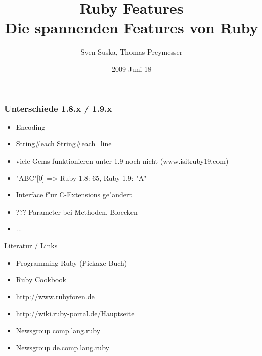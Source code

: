 \documentclass{beamer}
\title[Ruby]{Ruby Features\\Die spannenden Features von Ruby}
\author{Sven Suska, Thomas Preymesser}
\date{2009-Juni-18}
\begin{document}
\lstset{language=Ruby}
\lstset{basicstyle=\small,numbers=left, numberstyle=\tiny, numbersep=5pt}
\begin{frame}
\titlepage
\end{frame}











\begin{frame}
 \frametitle{Unterschiede 1.8.x / 1.9.x}
 \begin{itemize}
   \item<1->Encoding
   \item<2->String#each \arrow String#each_line
   \item<3->viele Gems funktionieren unter 1.9 noch nicht (www.isitruby19.com)
   \item<4->"ABC"[0] => Ruby 1.8: 65, Ruby 1.9: "A"
   \item<5->Interface f"ur C-Extensions ge"andert
   \item<6->??? Parameter bei Methoden, Bloecken
   \item ... 
 \end{itemize}

\end{frame}

\begin{frame}
  Literatur / Links
  \begin{itemize}
    \item Programming Ruby (Pickaxe Buch) 
    \item Ruby Cookbook
    \item http://www.rubyforen.de
    \item http://wiki.ruby-portal.de/Hauptseite
    \item Newsgroup comp.lang.ruby 
    \item Newsgroup de.comp.lang.ruby 
  \end{itemize}
\end{frame}
\end{document}
